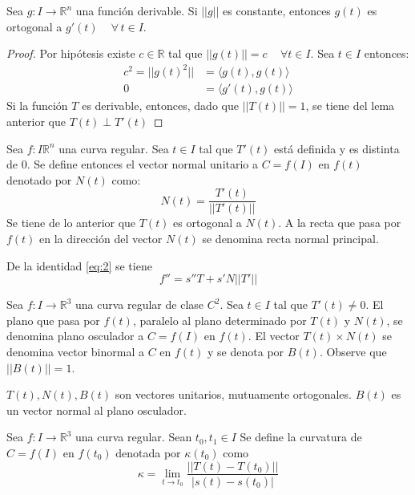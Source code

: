 \begin{lemma}
  Sea $g:I \to \mathbb{R}^n$ una función derivable. Si $||g||$ es constante,
  entonces $g(t)$ es ortogonal a $g'(t) \, \quad \forall \, t \in I$.
\end{lemma}
\begin{proof}
  Por hipótesis existe $c \in \mathbb{R}$ tal que $||g(t)|| =c \, \quad \forall t \in
  I$. Sea $t  \in I$ entonces:
  \begin{align*}
    c^2 = ||g(t)^2|| &= \langle g(t),g(t) \rangle \\
    0&= \langle g'(t), g(t) \rangle
  \end{align*}
  Si la función $T$ es derivable, entonces, dado que $||T(t)|| = 1$, se tiene
  del lema anterior que $T(t) \perp T'(t)$
\end{proof}
\begin{definition}
  Sea $f: I \mathbb{R}^n$ una curva regular. Sea $t \in I$ tal que $T'(t)$ está
  definida y es distinta de $0$. Se define entonces el vector normal unitario a
  $C= f(I)$ en $f(t)$ denotado por $N(t)$ como:
  \[
    N(t) = \frac{T'(t)}{||T'(t)||}
  \]
  Se tiene de lo anterior que $T(t)$ es ortogonal a $N(t)$. A la recta que pasa
  por $f(t)$ en la dirección del vector $N(t)$ se denomina recta normal
  principal.
\end{definition}
\begin{remark}
  De la identidad \eqref{eq:2} se tiene
  \begin{equation}\label{eq:3}
    f'' = s''T + s'N||T'|| 
  \end{equation}

\end{remark}
\begin{definition}
  Sea $f: I \to \mathbb{R}^3$ una curva regular de clase $C^2$. Sea $t \in I$
  tal que $T'(t) \neq 0$. El plano que pasa por $f(t)$, paralelo al plano
  determinado por $T(t)$ y $N(t)$, se denomina plano osculador a $C = f(I)$ en
  $f(t)$. El vector $T(t) \times N(t)$ se denomina vector binormal a $C$ en
  $f(t)$ y se denota por $B(t)$. Observe que $||B(t)||=1$.
\end{definition}
$T(t), N(t),B(t)$ son vectores unitarios, mutuamente ortogonales. 
$B(t)$ es un vector normal al plano osculador.
\begin{definition}
  Sea $f: I \to \mathbb{R}^3$ una curva regular. Sean $t_0, t_1 \in I$ 
  Se define la curvatura de $C=f(I)$ en $f(t_0)$ denotada por $\kappa(t_0)$ como
  \[
    \kappa = \lim_{t\to t_0} \frac{||T(t)- T(t_0)||}{|s(t)-s(t_0)|}
  \]
\end{definition}
